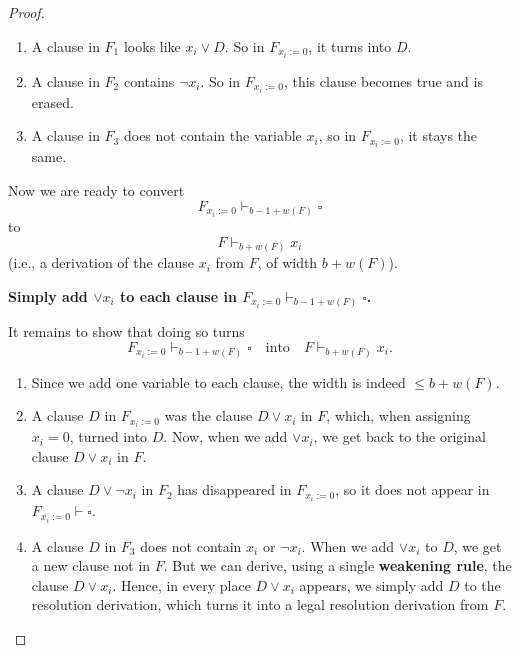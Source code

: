 \begin{proof}
\begin{enumerate}
    \item A clause in $F_1$ looks like $x_i \lor D$.  
    So in $F_{x_i := 0}$, it turns into $D$.
    
    \item A clause in $F_2$ contains $\neg x_i$.  
    So in $F_{x_i := 0}$, this clause becomes true and is erased.
    
    \item A clause in $F_3$ does not contain the variable $x_i$,  
    so in $F_{x_i := 0}$, it stays the same.
\end{enumerate}

Now we are ready to convert  
\[
F_{x_i := 0} \vdash_{b - 1 + w(F)} \square
\]  
to  
\[
F \vdash_{b + w(F)} x_i
\]  
(i.e., a derivation of the clause $x_i$ from $F$, of width $b + w(F)$).

\begin{center}
        \textbf{Simply add $\lor x_i$ to each clause in $F_{x_i := 0} \vdash_{b - 1 + w(F)} \square$.}
\end{center}
 

It remains to show that doing so turns  
\[
F_{x_i := 0} \vdash_{b - 1 + w(F)} \square \quad \text{into} \quad F \vdash_{b + w(F)} x_i.
\]

\begin{enumerate}
    \item Since we add one variable to each clause, the width is indeed $\leq b + w(F)$.
    
    \item A clause $D$ in $F_{x_i := 0}$ was the clause $D \lor x_i$ in $F$,  
    which, when assigning $x_i = 0$, turned into $D$.  
    Now, when we add $\lor x_i$, we get back to the original clause $D \lor x_i$ in $F$.

    \item A clause $D \lor \neg x_i$ in $F_2$ has disappeared in $F_{x_i := 0}$,  
    so it does not appear in $F_{x_i := 0} \vdash \square$.

    \item A clause $D$ in $F_3$ does not contain $x_i$ or $\neg x_i$.  
    When we add $\lor x_i$ to $D$, we get a new clause not in $F$.  
    But we can derive, using a single \textbf{weakening rule}, the clause $D \lor x_i$.  
    Hence, in every place $D \lor x_i$ appears, we simply add $D$ to the resolution derivation,  
    which turns it into a legal resolution derivation from $F$.
\end{enumerate}


\end{proof}
